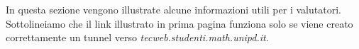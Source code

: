 In questa sezione vengono illustrate alcune informazioni utili per i valutatori.
Sottolineiamo che il link illustrato in prima pagina funziona solo se viene creato correttamente un tunnel verso \textit{tecweb.studenti.math.unipd.it}.